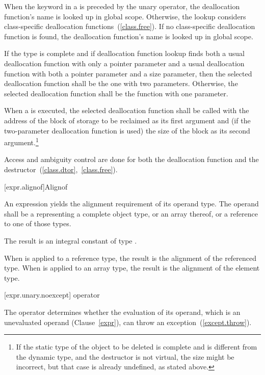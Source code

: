 \pnum
When the keyword  in a  is
preceded by the unary \tcode{::} operator, the deallocation function's name is looked
up in global scope. Otherwise, the lookup considers class-specific deallocation
functions~(\ref{class.free}). If no class-specific deallocation function is found,
the deallocation function's name is looked up in global scope.

\pnum
If the type is complete and if deallocation function lookup finds both a usual
deallocation function with only a pointer parameter and a usual deallocation
function with both a pointer parameter and a size parameter, then the selected
deallocation function shall be the one with two parameters. Otherwise, the selected
deallocation function shall be the function with one parameter.

\pnum
When a 
is executed, the selected deallocation function shall be called with
the address of the block of storage to be reclaimed as its first argument and
(if the two-parameter deallocation function is used) the size of the block as its
second argument.\footnote{If the static type of the object to be deleted is complete
and is different from the dynamic type, and the destructor is not virtual, the size might
be incorrect, but that case is already undefined, as stated above.}

\pnum
Access and ambiguity control are done for both the deallocation function
and the destructor~(\ref{class.dtor},~\ref{class.free}).

[expr.alignof]{Alignof}

\pnum
{}%
An  expression yields the alignment requirement
of its operand type. The operand shall be a 
representing a complete object type, or an array thereof, or a reference
to one of those types.

\pnum
The result is an integral constant of type
.

\pnum
When  is applied to a reference type, the result
is the alignment of the referenced type. When 
is applied to an array type, the result is the alignment of the
element type.

[expr.unary.noexcept]{ operator}

\pnum
{}%
The  operator determines whether the evaluation of its operand,
which is an unevaluated operand (Clause~\ref{expr}), can throw an
exception~(\ref{except.throw}).

